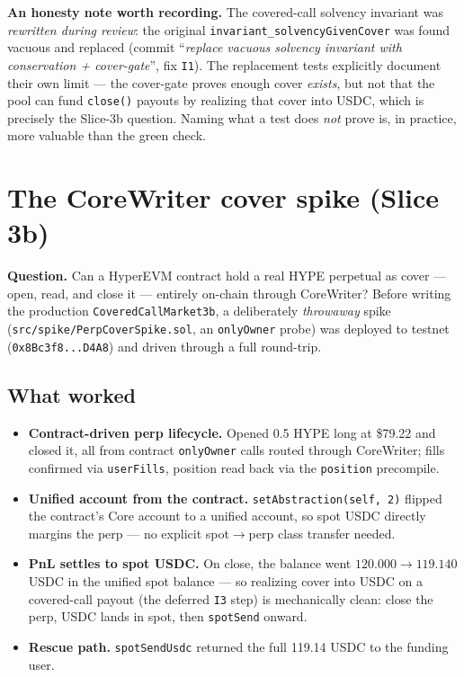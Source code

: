 \documentclass[11pt]{article}
\newcommand{\code}[1]{\texttt{\small #1}}
\begin{document}
\textbf{An honesty note worth recording.} The covered-call solvency invariant was \emph{rewritten
during review}: the original \code{invariant\_solvencyGivenCover} was found vacuous and replaced
(commit ``\emph{replace vacuous solvency invariant with conservation + cover-gate}'', fix \code{I1}).
The replacement tests explicitly document their own limit --- the cover-gate proves enough cover
\emph{exists}, but not that the pool can fund \code{close()} payouts by realizing that cover into
USDC, which is precisely the Slice-3b question. Naming what a test does \emph{not} prove is, in
practice, more valuable than the green check.

\section{The CoreWriter cover spike (Slice 3b)}\label{sec:spike}

\textbf{Question.} Can a HyperEVM contract hold a real HYPE perpetual as cover --- open, read, and
close it --- entirely on-chain through CoreWriter? Before writing the production
\code{CoveredCallMarket3b}, a deliberately \emph{throwaway} spike
(\code{src/spike/PerpCoverSpike.sol}, an \code{onlyOwner} probe) was deployed to testnet
(\code{0x8Bc3f8...D4A8}) and driven through a full round-trip.

\subsection{What worked}
\begin{itemize}[leftmargin=1.4em,itemsep=2pt]
  \item \textbf{Contract-driven perp lifecycle.} Opened 0.5 HYPE long at \$79.22 and closed it, all
        from contract \code{onlyOwner} calls routed through CoreWriter; fills confirmed via
        \code{userFills}, position read back via the \code{position} precompile.
  \item \textbf{Unified account from the contract.} \code{setAbstraction(self, 2)} flipped the
        contract's Core account to a unified account, so spot USDC directly margins the perp --- no
        explicit spot$\to$perp class transfer needed.
  \item \textbf{PnL settles to spot USDC.} On close, the balance went $120.000 \to 119.140$ USDC in
        the unified spot balance --- so realizing cover into USDC on a covered-call payout (the
        deferred \code{I3} step) is mechanically clean: close the perp, USDC lands in spot, then
        \code{spotSend} onward.
  \item \textbf{Rescue path.} \code{spotSendUsdc} returned the full 119.14 USDC to the funding user.
\end{itemize}
\end{document}
